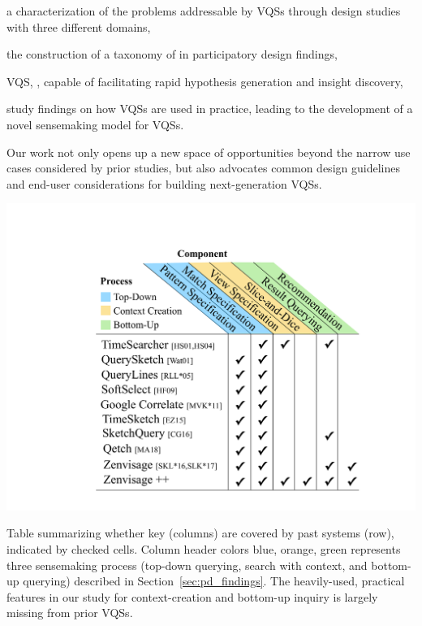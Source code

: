 \begin{denselist}
\item a characterization of the problems addressable by VQSs through design studies with three different domains,
\item the construction of a taxonomy of  in participatory design findings, %
\item {} VQS, \zvpp,  capable of facilitating rapid hypothesis generation and insight discovery,
\item study findings on how VQSs are used in practice, leading to the development of a novel sensemaking model for VQSs. %
\end{denselist}
Our work not only opens up a new space of opportunities beyond the narrow use cases considered by prior studies, but also advocates common design guidelines and end-user considerations for building next-generation VQSs.
\begin{table}[h!]
    \centering
    \includegraphics[width=0.8\linewidth]{figures/related_works_table.pdf}
    \caption{Table summarizing whether key  (columns) are covered by past systems (row), indicated by checked cells. Column header colors blue, orange, green represents three sensemaking process (top-down querying, search with context, and bottom-up querying) described in Section~\ref{sec:pd_findings}. The heavily-used, practical features in our study for context-creation and bottom-up inquiry is largely missing from prior VQSs.}
    \label{table:relatedwork}
    \vspace{-10pt}
\end{table}
